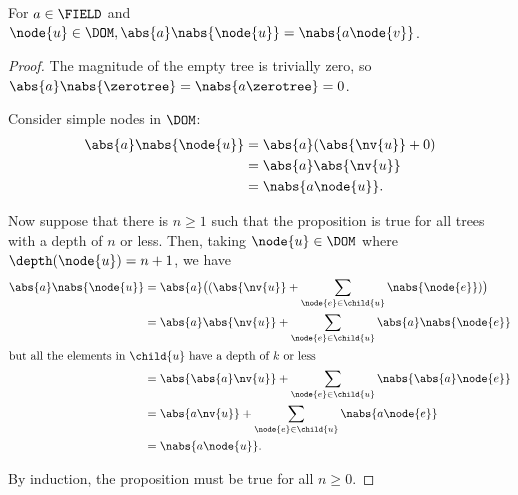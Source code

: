 \begin{proposition}\label{absolutehomogeneity}
  For \(a \in \FIELD\) and \(\node{u} \in \DOM, \abs{a}\nabs{\node{u}} =
  \nabs{a \node{v}}\).
\begin{proof}
  The magnitude of the empty tree is trivially zero, so \(\abs{a}\nabs{\zerotree} =
  \nabs{a\zerotree} = 0\).

  Consider simple nodes in $\DOM$:
  \begin{align*}
      \abs{a}\nabs{\node{u}} &= \abs{a}(\abs{\nv{u}} + 0) \\
      &= \abs{a}\abs{\nv{u}} \\
      &= \nabs{a \node{u}}.
  \end{align*}

  Now suppose that there is \(n \ge 1\) such that the proposition is true for
  all trees with a depth of \(n\) or less. Then, taking \(\node{u} \in
  \DOM\) where \(\depth(\node{u}) = n+1\), we have
  \begin{align*}
      \abs{a}\nabs{\node{u}} &= \abs{a}\bigl((\abs{\nv{u}} + \sum_{\node{e}\in\child{u}}\nabs{\node{e}})\bigr) \\
      &= \abs{a}\abs{\nv{u}} + \sum_{\node{e}\in\child{u}}\abs{a}\nabs{\node{e}}\\
      \intertext{but all the elements in \(\child{u}\) have a depth of \(k\) or less}
      &= \abs{\abs{a}\nv{u}} + \sum_{\node{e}\in\child{u}}\nabs{\abs{a}\node{e}} \\
      &= \abs{a\nv{u}} + \sum_{\node{e}\in\child{u}}\nabs{a \node{e}} \\
      &= \nabs{a \node{u}}.
  \end{align*}

  By induction, the proposition must be true for all \(n \geq 0\).
\end{proof}
\end{proposition}


